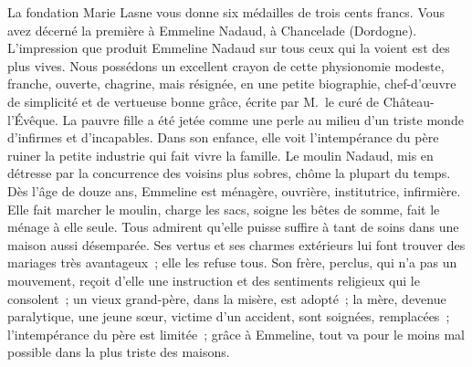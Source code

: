 \documentclass[french,twoside]{book} %
\newcommand\orgName[1]{#1}
\newcommand\persName[1]{#1}
\newcommand\placeName[1]{#1}
\begin{document}
La {\orgName fondation Marie Lasne} vous donne six médailles de trois cents francs. Vous avez décerné la première à {\persName Emmeline Nadaud}, à {\placeName Chancelade} ({\placeName Dordogne}). L’impression que produit {\persName Emmeline Nadaud} sur tous ceux qui la voient est des plus vives. Nous possédons un excellent crayon de cette physionomie modeste, franche, ouverte, chagrine, mais résignée, en une petite biographie, chef-d’œuvre de simplicité et de vertueuse bonne grâce, écrite par {\persName M. le curé de Château-l’Évêque}. La pauvre fille a été jetée comme une perle au milieu d’un triste monde d’infirmes et d’incapables. Dans son enfance, elle voit l’intempérance du père ruiner la petite industrie qui fait vivre la famille. Le {\placeName moulin Nadaud}, mis en détresse par la concurrence des voisins plus sobres, chôme la plupart du temps. Dès l’âge de douze ans, {\persName Emmeline} est ménagère, ouvrière, institutrice, infirmière. Elle fait marcher le moulin, charge les sacs, soigne les bêtes de somme, fait le ménage à elle seule. Tous admirent qu’elle puisse suffire à tant de soins dans une maison aussi désemparée. Ses vertus et ses charmes extérieurs lui font trouver des mariages très avantageux ; elle les refuse tous. Son frère, perclus, qui n’a pas un mouvement, reçoit d’elle une instruction et des sentiments religieux qui le consolent ; un vieux grand-père, dans la misère, est adopté ; la mère, devenue paralytique, une jeune sœur, victime d’un accident, sont soignées, remplacées ; l’intempérance du père est limitée ; grâce à Emmeline, tout va pour le moins mal possible dans la plus triste des maisons.\par
\end{document}
